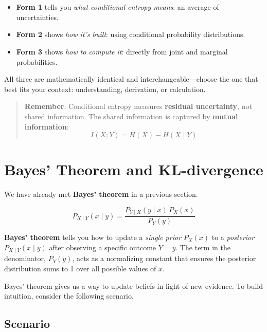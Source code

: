 \documentclass[11pt]{article}
\begin{document}
\section*{\texorpdfstring{\faComment}{Interpretation Summary}}

\begin{itemize}
    \item \textbf{Form 1} tells you \textit{what conditional entropy means}: an average of uncertainties.
    \item \textbf{Form 2} shows \textit{how it’s built}: using conditional probability distributions.
    \item \textbf{Form 3} shows \textit{how to compute it}: directly from joint and marginal probabilities.
\end{itemize}

All three are mathematically identical and interchangeable—choose the one that best fits your context: understanding, derivation, or calculation.

\begin{quote}
\textbf{Remember}: Conditional entropy measures \textbf{residual uncertainty}, not shared information. The shared information is captured by \textbf{mutual information}:
\[
I(X;Y) = H(X) - H(X \mid Y)
\]
\end{quote}


\section{Bayes' Theorem and KL-divergence}

We have already met \textbf{Bayes' theorem} in a previous section.

\begin{equation*} 
\boxed{
P_{X \mid Y}(x \mid y) = \frac{P_{Y \mid X}(y \mid x) \, P_X(x)}{P_Y(y)} }
\end{equation*}

\textbf{Bayes' theorem} tells you how to update a \emph{single prior} \(P_X(x)\) to a \emph{posterior} \(P_{X \mid Y}(x \mid y)\) after observing a specific outcome \(Y = y\).  
The term in the denominator, \(P_Y(y)\), acts as a normalizing constant that ensures the posterior distribution sums to 1 over all possible values of \(x\).

Bayes' theorem gives us a way to update beliefs in light of new evidence. To build intuition, consider the following scenario.

\subsection*{Scenario}
\end{document}

